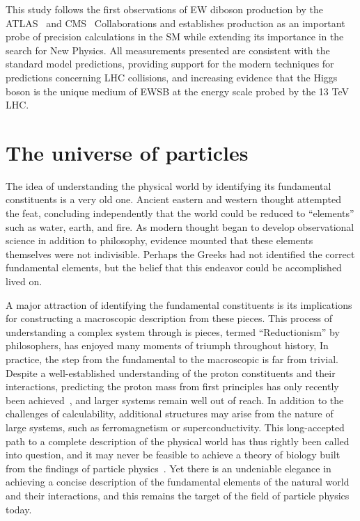 This study follows the first observations of EW diboson production
by the ATLAS~\cite{ATLAS-CONF-2018-030,ATLAS-CONF-2018-033} and CMS~\cite{Sirunyan:2017ret} Collaborations
and establishes \EWWZ production as an important
probe of precision calculations in the SM while extending its importance 
in the search for New Physics.
All measurements presented are consistent with the standard model predictions,
providing support for the modern techniques for predictions concerning LHC collisions, and 
increasing evidence that the Higgs boson is the unique medium of EWSB 
at the energy scale probed by the 13 TeV LHC.

\section{The universe of particles}

The idea of understanding the physical world by identifying its
fundamental constituents is a very old one. Ancient eastern and
western thought attempted the feat, concluding
independently that the world could be reduced 
to ``elements'' such as water, earth, and fire.
As modern thought began to develop observational science in addition
to philosophy, evidence mounted that these elements themselves were 
not indivisible. Perhaps the Greeks had not identified
the correct fundamental elements, but the belief that this endeavor could
be accomplished lived on.

A major attraction of identifying the fundamental constituents 
is its implications for constructing a macroscopic description from these
pieces. This process of understanding a complex system through is pieces, 
termed ``Reductionism'' by philosophers, has enjoyed
many moments of triumph throughout history, 
In practice, the step from the fundamental to the macroscopic 
is far from trivial. Despite a well-established
understanding of the proton constituents and their interactions,
predicting the proton mass from first principles has only recently 
been achieved~\cite{Durr:2008zz}, and larger systems remain well
out of reach.
In addition to the challenges of calculability, additional structures
may arise from the nature of large systems, such as ferromagnetism or 
superconductivity.
This long-accepted path to a complete description of the physical world
has thus rightly been called into question, and it may never be feasible
to achieve a theory of biology built from the findings of particle 
physics~\cite{Anderson393}.
Yet there is an undeniable elegance in achieving a concise description
of the fundamental elements of the natural world and their interactions,
and this remains the target of the field of particle physics today. 


